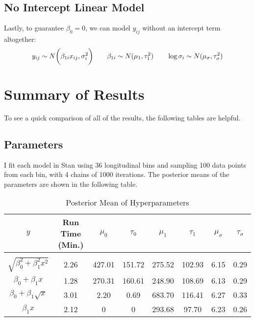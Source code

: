 \documentclass[12pt]{article}
\begin{document}
\subsection{No Intercept Linear Model}
Lastly, to guarantee $\beta_0 = 0$, we can model $y_{ij}$ without an intercept term altogether:
$$y_{ij} \sim N \biggl( \beta_{1i} x_{ij} , \sigma_i^2 \biggr)
\hspace{20 pt} \beta_{1i} \sim N(\mu_1,\tau_1^2)
\hspace{20 pt} \log\sigma_i \sim N(\mu_\sigma,\tau_\sigma^2)$$

\pagebreak
\section{Summary of Results}
To see a quick comparison of all of the results, the following tables are helpful.
\subsection{Parameters}
I fit each model in Stan using 36 longitudinal bins and sampling 100 data points from each bin, with 4 chains of 1000 iterations. The posterior means of the parameters are shown in the following table.
\begin{table}[ht]
\caption{Posterior Mean of Hyperparameters}
\centering
\begin{tabular}{c c c c c c c c}
\hline\hline
$y$ & Run Time (Min.) & $\mu_0$ & $\tau_0$ & $\mu_1$ & $\tau_1$ & $\mu_\sigma$ & $\tau_\sigma$ \\ [0.5ex] %
\hline \\
$\sqrt{\beta_0^2+\beta_1^2x^2}$ & 2.26 & 427.01 & 151.72 & 275.52 &  102.93 & 6.15 &  0.29 \\
$\beta_0+\beta_1x$ & 1.28 & 270.31 & 160.61 & 248.90 & 108.69 & 6.13 &  0.29\\
$\beta_0+\beta_1\sqrt{x}$ & 3.01 & 2.20 & 0.69 & 683.70 & 116.41 & 6.27 & 0.33\\
$\beta_1x$ & 2.12 & 0 & 0 & 293.68 & 97.70 & 6.23 &  0.26\\ 
\hline
\end{tabular}
\label{table:nonlin}
\end{table}
\end{document}
